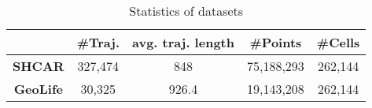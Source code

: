 \documentclass[10pt,conference,letterpaper]{IEEEtran}
\begin{document}




%
%

\begin{table}[t]
	\renewcommand{\arraystretch}{1.1}
	
	\caption{Statistics of datasets}\label{tab:datasets}
	\vspace{-.1in}
	\centering
	\scriptsize{
		\begin{tabular}{|c|c|c|c|c|}
			\hline
			& \textbf{\#Traj.} & \textbf{avg. traj. length} & \textbf{\#Points} & \textbf{\#Cells}\\
			\hline
			\textbf{SHCAR} & 327,474 & 848 & 75,188,293& 262,144\\
			\hline
			\textbf{GeoLife} & 30,325 & 926.4 & 19,143,208& 262,144\\
			\hline
		\end{tabular}
	}
	\vspace{-.1in}
\end{table}
\end{document}

